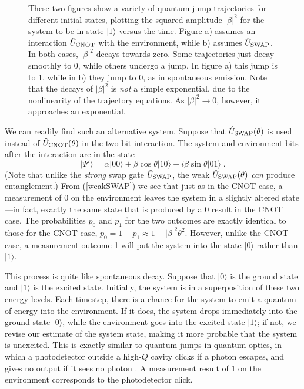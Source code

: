 \documentclass[12pt]{article}
\def\ket#1{{| #1 \rangle}}
\def\U{{\hat U}}
\begin{document}
\begin{figure}
\begin{center}
\label{fig3}
\end{center}
\caption{\small These two figures show a variety of quantum jump trajectories
for different initial states, plotting the squared amplitude $|\beta|^2$
for the system to be in state $\ket1$ versus the time.
Figure a) assumes an interaction
$\U_{\rm CNOT}$ with the environment, while b) assumes $\U_{\rm SWAP}$.
In both cases, $|\beta|^2$ decays towards zero.  Some trajectories just
decay smoothly to 0, while others undergo a jump.  In figure a) this
jump is to 1, while in b) they jump to 0, as in spontaneous emission.
Note that the decays of $|\beta|^2$ is {\it not} a simple exponential,
due to the nonlinearity of the trajectory equations.  As
$|\beta|^2 \rightarrow 0$, however, it approaches an exponential.}
\end{figure}
\newpage

We can readily find such an alternative system.
Suppose that $\U_{\rm SWAP}(\theta)$
is used instead of
$\U_{\rm CNOT}(\theta)$
in the two-bit interaction.  The system and environment bits
after the interaction are in the state
\begin{equation}
\ket{\Psi'} = \alpha\ket{00} + \beta\cos\theta\ket{10}
  - i \beta\sin\theta\ket{01} \;.
\label{weakSWAP}
\end{equation}
(Note that unlike the {\it strong} swap gate $\U_{\rm SWAP}$, the weak
$\U_{\rm SWAP}(\theta)$ {\it can} produce entanglement.)
From (\ref{weakSWAP}) we see that just as in the CNOT case,
a measurement of 0 on the environment leaves the system in a slightly
altered state---in fact, exactly the same state that is produced by a 0
result in the CNOT case.  The probabilities $p_0$ and $p_1$ for the two
outcomes are exactly identical to those for the CNOT case,
$p_0 = 1 - p_1 \approx 1 - |\beta|^2\theta^2$.  However, unlike
the CNOT case, a measurement outcome 1 will put the system
into the state $\ket0$ rather than $\ket1$.

This process is quite like spontaneous decay.  Suppose that $\ket0$
is the ground state and $\ket1$ is the excited state.  Initially, the
system is in a superposition of these two energy levels.  Each timestep,
there is a chance for the system to emit a quantum of energy into the
environment.  If it does, the system drops immediately into
the ground state $\ket0$, while the environment goes into the
excited state $\ket1$; if not, we revise our estimate of the system state,
making it more probable that the system is unexcited.  This is exactly
similar to quantum jumps in quantum optics, in which
a photodetector outside a high-$Q$ cavity clicks if a photon escapes,
and gives no output if it sees no photon \cite{Carmichael,Dum,Gardiner}.
A measurement result of 1 on the environment corresponds to the
photodetector click.
\end{document}
